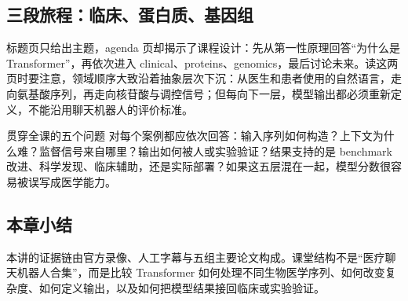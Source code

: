 \subsection{三段旅程：临床、蛋白质、基因组}

标题页只给出主题，agenda 页却揭示了课程设计：先从第一性原理回答“为什么是 Transformer”，再依次进入 clinical、proteins、genomics，最后讨论未来。读这两页时要注意，领域顺序大致沿着抽象层次下沉：从医生和患者使用的自然语言，走向氨基酸序列，再走向核苷酸与调控信号；但每向下一层，模型输出都必须重新定义，不能沿用聊天机器人的评价标准。




\begin{importantbox}{贯穿全课的五个问题}
对每个案例都应依次回答：输入序列如何构造？上下文为什么难？监督信号来自哪里？输出如何被人或实验验证？结果支持的是 benchmark 改进、科学发现、临床辅助，还是实际部署？如果这五层混在一起，模型分数很容易被误写成医学能力。
\end{importantbox}

\subsection{本章小结}

本讲的证据链由官方录像、人工字幕与五组主要论文构成。课堂结构不是“医疗聊天机器人合集”，而是比较 Transformer 如何处理不同生物医学序列、如何改变复杂度、如何定义输出，以及如何把模型结果接回临床或实验验证。

